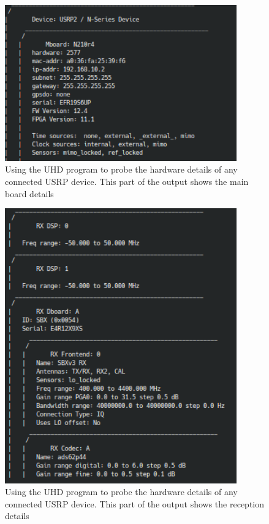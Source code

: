\begin{figure}[h]
    \begin{centering}
        \includegraphics[width=10cm,keepaspectratio]{Figures/usrp-probe-output_1.png}
        \caption{Using the UHD program to probe the hardware details of any connected USRP device. This part of the output shows the main board details}
    \label{fig:UHDProbe1}
    \end{centering}
\end{figure}

\begin{figure}[h]
    \begin{centering}
        \includegraphics[width=10cm,keepaspectratio]{Figures/usrp-probe-output_2.png}
        \caption{Using the UHD program to probe the hardware details of any connected USRP device. This part of the output shows the reception details}
    \label{fig:UHDProbe2}
    \end{centering}
\end{figure}

